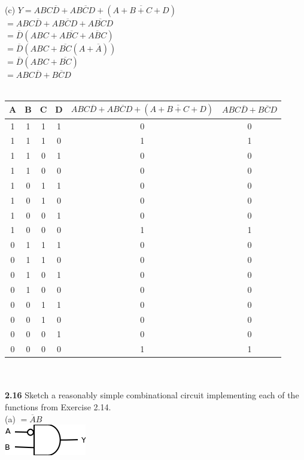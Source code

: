 \documentclass[12pt,a4paper]{report}
\newcommand*{\al}{\overline{A}}
\newcommand*{\dl}{\overline{D}}
\begin{document}
\begin{normalsize}
(c) $ Y = ABC\overline{D} + A\overline{BCD} + (\overline{A + B + C + D}) $ \\
$ = ABC\dl{} + A\overline{BCD} + \overline{ABCD} $ \\
$ = \dl{}(ABC + A\overline{BC} + \overline{ABC}) $ \\
$ = \dl{}(ABC + \overline{BC}(A + \al{})) $ \\
$ = \dl{}(ABC + \overline{BC}) $ \\
$ = ABC\dl{} + \overline{BCD} $ \\ \\
\begin{tabular}{|c|c|c|c|c|c|}
A & B & C & D & $ ABC\overline{D} + A\overline{BCD} + (\overline{A + B + C + D}) $ & $ ABC\dl{} + \overline{BCD} $ \\ 
\hline 
1 & 1 & 1 & 1 & 0 & 0 \\ 
\hline 
1 & 1 & 1 & 0 & 1 & 1 \\ 
\hline 
1 & 1 & 0 & 1 & 0 & 0 \\ 
\hline 
1 & 1 & 0 & 0 & 0 & 0 \\ 
\hline 
1 & 0 & 1 & 1 & 0 & 0 \\ 
\hline 
1 & 0 & 1 & 0 & 0 & 0 \\ 
\hline 
1 & 0 & 0 & 1 & 0 & 0 \\ 
\hline 
1 & 0 & 0 & 0 & 1 & 1 \\ 
\hline 
0 & 1 & 1 & 1 & 0 & 0 \\ 
\hline 
0 & 1 & 1 & 0 & 0 & 0 \\ 
\hline 
0 & 1 & 0 & 1 & 0 & 0 \\ 
\hline 
0 & 1 & 0 & 0 & 0 & 0 \\ 
\hline 
0 & 0 & 1 & 1 & 0 & 0 \\ 
\hline 
0 & 0 & 1 & 0 & 0 & 0 \\ 
\hline 
0 & 0 & 0 & 1 & 0 & 0 \\ 
\hline 
0 & 0 & 0 & 0 & 1 & 1 \\ 
\hline 
\end{tabular} \\ \\


\textbf{2.16} Sketch a reasonably simple combinational circuit implementing each of the functions from Exercise 2.14.\\
(a) $ = \al{}B $ \\
\includegraphics[scale=1]{2_16A} \\


\end{normalsize}
\end{document}
